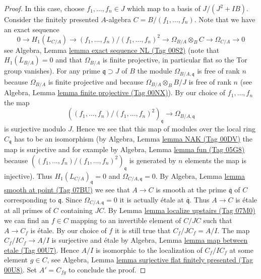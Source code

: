 \documentclass{amsart}
\theoremstyle{plain}
\theoremstyle{definition}
\theoremstyle{remark}
\numberwithin{equation}{subsection}
\begin{document}
\begin{proof}
\medskip\noindent
In this case, choose $f_1, \ldots, f_n \in J$ which map to a
basis of $J/(J^2 + IB)$. Consider the finitely presented $A$-algebra
$C = B/(f_1, \ldots, f_n)$. Note that we have an exact sequence
$$
0 \to H_1(L_{C/A}) \to (f_1, \ldots, f_n)/(f_1, \ldots, f_n)^2
\to \Omega_{B/A} \otimes_B C \to \Omega_{C/A} \to 0
$$
see Algebra, Lemma \href{https://stacks.math.columbia.edu/tag/00S2}{lemma exact sequence NL (Tag 00S2)} (note that
$H_1(L_{B/A}) = 0$ and that $\Omega_{B/A}$ is finite projective,
in particular flat so the Tor group vanishes). For any prime
$\mathfrak q \supset J$ of $B$ the module $\Omega_{B/A, \mathfrak q}$
is free of rank $n$ because $\Omega_{B/A}$ is finite projective and
because $\Omega_{B/A} \otimes_B B/J$ is free of rank $n$
(see Algebra, Lemma \href{https://stacks.math.columbia.edu/tag/00NX}{lemma finite projective (Tag 00NX)}). By our choice
of $f_1, \ldots, f_n$ the map
$$
\left((f_1, \ldots, f_n)/(f_1, \ldots, f_n)^2\right)_{\mathfrak q}
\to
\Omega_{B/A, \mathfrak q}
$$
is surjective modulo $J$. Hence we see that this map of modules over
the local ring $C_{\mathfrak q}$ has to be an isomorphism
(by Algebra, Lemma \href{https://stacks.math.columbia.edu/tag/00DV}{lemma NAK (Tag 00DV)} the map is surjective
and for example by Algebra, Lemma \href{https://stacks.math.columbia.edu/tag/05G8}{lemma fun (Tag 05G8)}
because $((f_1, \ldots, f_n)/(f_1, \ldots, f_n)^2)_{\mathfrak q}$
is generated by $n$ elements the map is injective). Thus
$H_1(L_{C/A})_{\mathfrak q} = 0$ and $\Omega_{C/A, \mathfrak q} = 0$. By
Algebra, Lemma \href{https://stacks.math.columbia.edu/tag/07BU}{lemma smooth at point (Tag 07BU)}
we see that $A \to C$ is smooth at the prime $\overline{\mathfrak q}$
of $C$ corresponding to $\mathfrak q$. Since
$\Omega_{C/A, \mathfrak q} = 0$ it is actually \'etale at
$\overline{\mathfrak q}$. Thus $A \to C$ is \'etale at all primes
of $C$ containing $JC$. By Lemma \href{https://stacks.math.columbia.edu/tag/07M0}{lemma localize upstairs (Tag 07M0)}
we can find an $f \in C$ mapping to an invertible element of $C/JC$ such that
$A \to C_f$ is \'etale. By our choice of $f$ it is still true that
$C_f/JC_f = A/I$. The map $C_f/IC_f \to A/I$ is surjective and
\'etale by Algebra, Lemma \href{https://stacks.math.columbia.edu/tag/00U7}{lemma map between etale (Tag 00U7)}.
Hence $A/I$ is isomorphic to the localization of $C_f/IC_f$ at
some element $g \in C$, see
Algebra, Lemma \href{https://stacks.math.columbia.edu/tag/00U8}{lemma surjective flat finitely presented (Tag 00U8)}.
Set $A' = C_{fg}$ to conclude the proof.
\end{proof}
\end{document}
